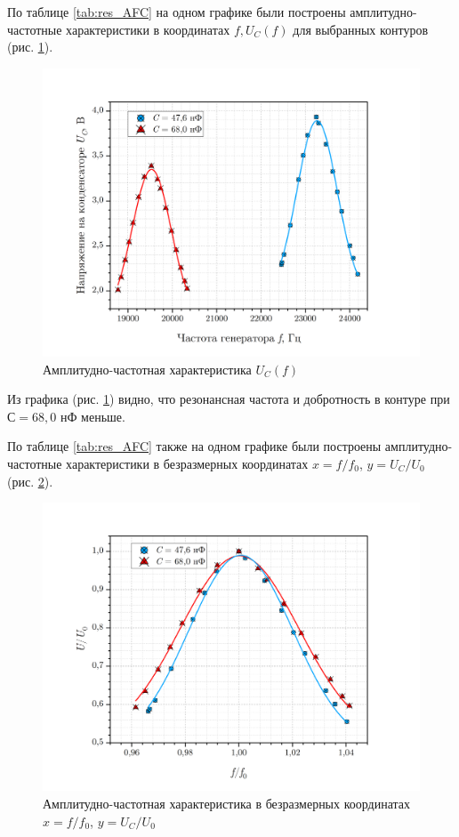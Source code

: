\documentclass[a4paper, 12pt]{article}
\begin{document}
    По таблице \ref{tab:res_AFC} на одном графике были построены амплитудно-частотные характеристики в координатах $f, U_C(f)$ для выбранных контуров (рис. \ref{graph_AFC}).

    \begin{figure}[H]
        \centering
        \includegraphics[width = 14cm]{images/graph_AFC.png}
        \caption{Амплитудно-частотная характеристика $U_C(f)$}
        \label{graph_AFC}
    \end{figure}

    Из графика (рис. \ref{graph_AFC}) видно, что резонансная частота и добротность в контуре при $С = 68,0$ нФ меньше. 

    По таблице \ref{tab:res_AFC} также на одном графике были построены амплитудно-частотные характеристики в безразмерных координатах $x = f/f_0$, $y = U_C/U_0$ (рис. \ref{graph_AFC_unit}).

    \begin{figure}[H]
        \centering
        \includegraphics[width = 14cm]{images/graph_AFC_unit.png}
        \caption{Амплитудно-частотная характеристика в безразмерных координатах $x = f/f_0$, $y = U_C/U_0$}
        \label{graph_AFC_unit}
    \end{figure}
    
\end{document}
